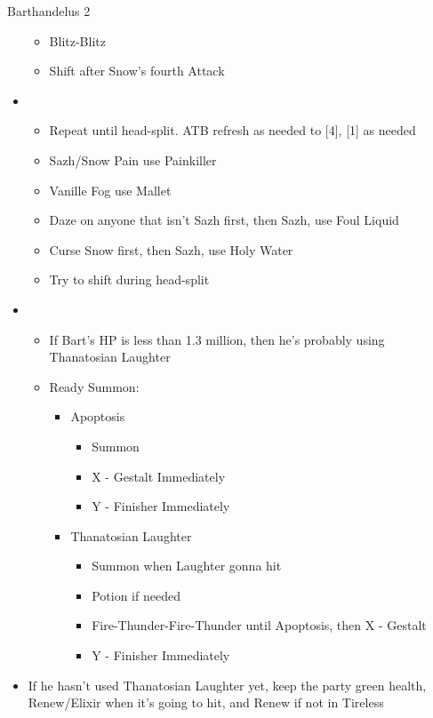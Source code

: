 \begin{battle}{Barthandelus 2}
\begin{multicols}{2}
\begin{itemize}
    \begin{itemize}
        \item Blitz-Blitz
        \item Shift after Snow's fourth Attack
    \end{itemize}
    \item \sixth
    \begin{itemize}
        \item Repeat until head-split. ATB refresh as needed to [4], [1] as needed
        \item Sazh/Snow Pain use Painkiller
        \item Vanille Fog use Mallet
        \item Daze on anyone that isn't Sazh first, then Sazh, use Foul Liquid
        \item Curse Snow first, then Sazh, use Holy Water
        \item Try to shift during head-split
    \end{itemize}
    \item \third
    \begin{itemize}
        \item If Bart's HP is less than 1.3 million, then he's probably using Thanatosian Laughter
        \item Ready Summon:
        \begin{itemize}
            \item Apoptosis
            \begin{itemize}
                \item Summon
                \item X - Gestalt Immediately
                \item Y - Finisher Immediately
            \end{itemize}
            \item Thanatosian Laughter
            \begin{itemize}
                \item Summon when Laughter gonna hit
                \item Potion if needed
                \item Fire-Thunder-Fire-Thunder until Apoptosis, then X - Gestalt
                \item Y - Finisher Immediately
            \end{itemize}
        \end{itemize}
    \end{itemize}
    \columnbreak
    \item If he hasn't used Thanatosian Laughter yet, keep the party green health, Renew/Elixir when it's going to hit, and Renew if not in Tireless

\end{itemize}
\end{multicols}
\end{battle}
